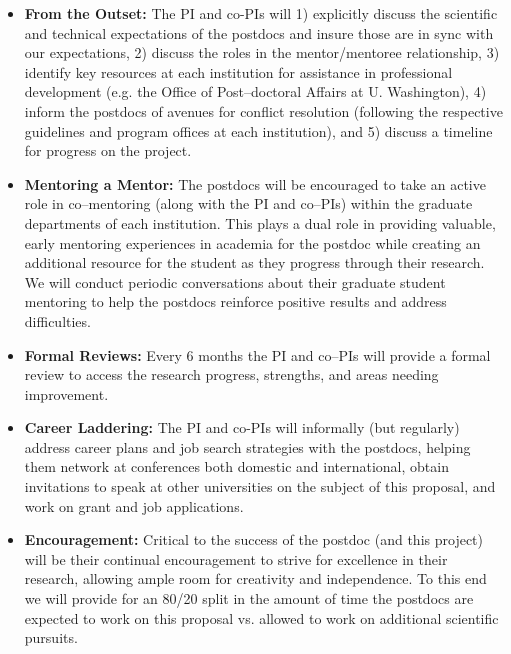 \documentclass[11pt]{article}
\begin{document}
\begin{itemize}

\item \textbf{From the Outset:} The PI and co-PIs will 1) explicitly discuss the
scientific and technical expectations of the postdocs and insure those are in
sync with our expectations, 2) discuss the roles in the mentor/mentoree
relationship, 3) identify key resources at each institution for assistance in
professional development (e.g. the Office of Post--doctoral Affairs at U.
Washington), 4) inform the postdocs of avenues for conflict resolution
(following the respective guidelines and program offices at each institution),
and 5) discuss a timeline for progress on the project.

\item \textbf{Mentoring a Mentor:} The postdocs will be encouraged to take an
active role in co--mentoring (along with the PI and co--PIs) within the graduate
departments of each institution.  This plays a dual role in providing valuable,
early mentoring experiences in academia for the postdoc while creating an
additional resource for the student as they progress through their research. We
will conduct periodic conversations about their graduate student mentoring to
help the postdocs reinforce positive results and address difficulties.

\item \textbf{Formal Reviews:} Every 6 months the PI and co--PIs will provide a
formal review to access the research progress, strengths, and areas needing
improvement.

\item \textbf{Career Laddering:} The PI and co-PIs will informally (but
regularly) address career plans and job search strategies with the postdocs,
helping them network at conferences both domestic and international, obtain
invitations to speak at other universities on the subject of this proposal, and
work on grant and job applications.

\item \textbf{Encouragement:} Critical to the success of the postdoc (and this
project) will be their continual encouragement to strive for excellence in their
research, allowing ample room for creativity and independence.  To this end we
will provide for an 80/20 split in the amount of time the postdocs are expected
to work on this proposal vs. allowed to work on additional scientific pursuits.

\end{itemize}
\end{document}
